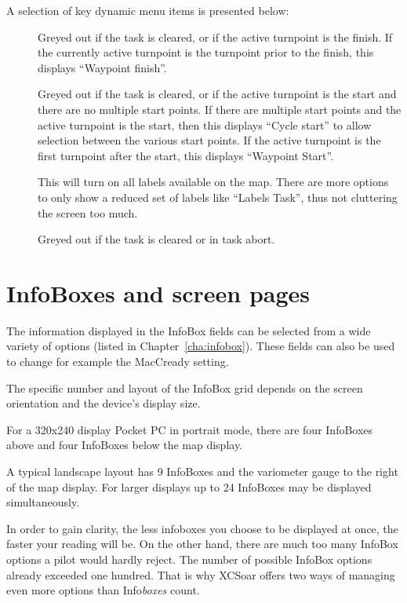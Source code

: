 A selection of key dynamic menu items is presented below:
\begin{description}
\item[]  
  Greyed out if the task is cleared, or if the active turnpoint is the
  finish. If the currently active turnpoint is the turnpoint prior to the 
  finish, this displays  ``Waypoint finish''.
\item[]  
  Greyed out if the task is cleared, or if the active turnpoint is the
  start and there are no multiple start points.  If there are multiple
  start points and the active turnpoint is the start, then this
  displays ``Cycle start'' to allow selection between the various
  start points.  If the active turnpoint is the first turnpoint after 
  the start, this displays ``Waypoint Start''.
\item[]  
  This will turn on all labels available on the map. There are more options to 
  only show a reduced set of labels like ``Labels Task'', thus not cluttering the 
  screen too much.
\item[]  
  Greyed out if the task is cleared or in task abort.
\end{description}


\section{InfoBoxes and screen pages}\label{sec:infoboxandpages}

The information displayed in the InfoBox fields can be selected from a
wide variety of options (listed in Chapter~\ref{cha:infobox}). These
fields can also be used to change for example the MacCready setting.

The specific number and layout of the InfoBox grid depends on the
screen orientation and the device's display size.  

For a 320x240 display
Pocket PC in portrait mode, there are four InfoBoxes above and four
InfoBoxes below the map display.  

A typical landscape layout has 9 InfoBoxes and the variometer gauge 
to the right of the map display. 
For larger displays up to 24 InfoBoxes may be displayed simultaneously.  

In order to gain clarity, the less infoboxes you choose to be displayed at once, 
the faster your reading will be. On the other hand, there are much too many 
InfoBox options a pilot would hardly reject. The number of possible InfoBox 
options already exceeded one hundred. That is why XCSoar offers two ways of 
managing even more options than Info\emph{boxes} count.

